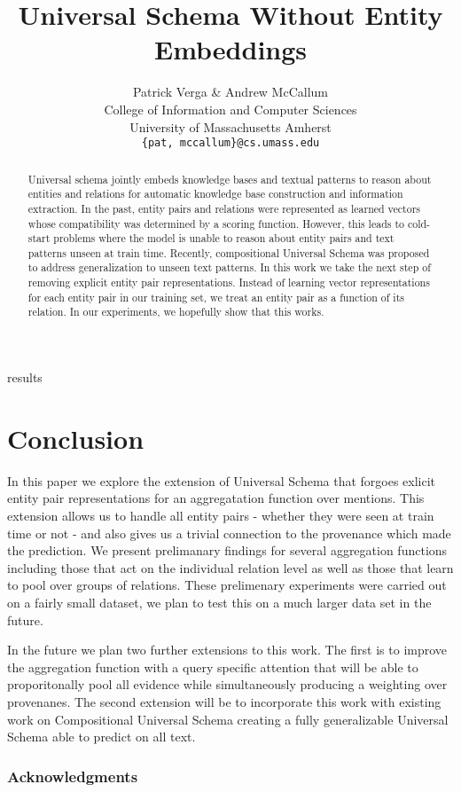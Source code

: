 \documentclass{article} %
\title{Universal Schema Without Entity Embeddings}
\author{Patrick Verga \& Andrew McCallum \\
    College of Information and Computer Sciences\\
    University of Massachusetts Amherst\\
    \texttt{\{pat, mccallum\}@cs.umass.edu} \\
}
\begin{document}
\maketitle

\begin{abstract}
Universal schema jointly embeds knowledge bases and textual patterns to reason about entities and relations for automatic knowledge base construction and information extraction. In the past, entity pairs and relations were represented as learned vectors whose compatibility was determined by a scoring function. However, this leads to cold-start problems where the model is unable to reason about entity pairs and text patterns unseen at train time. Recently, compositional Universal Schema was proposed to address generalization to unseen text patterns. In this work we take the next step of removing explicit entity pair representations. Instead of learning vector representations for each entity pair in our training set, we treat an entity pair as a function of its relation. In our experiments, we hopefully show that this works.
\end{abstract}







 {results}

\section{Conclusion}
In this paper we explore the extension of Universal Schema that forgoes exlicit entity pair representations for an aggregatation function over mentions.
This extension allows us to handle all entity pairs - whether they were seen at train time or not - and also gives us a trivial connection to the provenance which made the prediction.
We present prelimanary findings for several aggregation functions including those that act on the individual relation level as well as those that learn to pool over groups of relations.
These prelimenary experiments were carried out on a fairly small dataset, we plan to test this on a much larger data set in the future.

In the future we plan two further extensions to this work.
The first is to improve the aggregation function with a query specific attention that will be able to proporitonally pool all evidence while simultaneously producing a weighting over provenanes.
The second extension will be to incorporate this work with existing work on Compositional Universal Schema creating a fully generalizable Universal Schema able to predict on all text.


\subsubsection*{Acknowledgments}




\newpage
%
\end{document}
